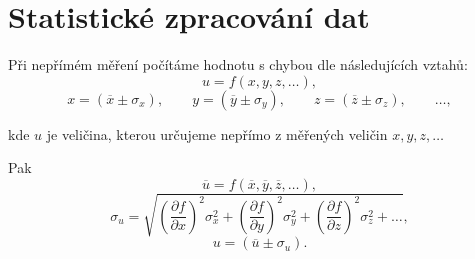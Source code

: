 \documentclass[english]{article}
\begin{document}
\section{Statistické zpracování dat}

%
%	
	
	
%	
%	
Při nepřímém měření počítáme hodnotu s chybou dle následujících vztahů:
	\begin{equation}
	u = f(x, y, z, \ldots),
	\end{equation}
	\begin{displaymath}
	x = (\overline{x} \pm \sigma_x), \qquad
	y = (\overline{y} \pm \sigma_y), \qquad
	z = (\overline{z} \pm \sigma_z), \qquad
	\ldots,
	\end{displaymath}
	
	kde $ u $ je veličina, kterou určujeme nepřímo z měřených veličin $ x, y, z, \ldots $ 
	
	Pak
	\begin{displaymath}
	\overline{u} = f(\overline{x}, \overline{y}, \overline{z}, \ldots),
	\end{displaymath}
	\begin{equation}\label{eq:chyba_neprime_mereni}
	\sigma_u = \sqrt{\left( \frac{\partial f}{\partial x} \right)^2 \sigma^2_x + \left( \frac{\partial f}{\partial y} \right)^2 \sigma^2_y + \left( \frac{\partial f}{\partial z} \right)^2 \sigma^2_z + \ldots},
	\end{equation}
	\begin{displaymath}
	u = (\overline{u} \pm \sigma_ u).
	\end{displaymath}
\end{document}
